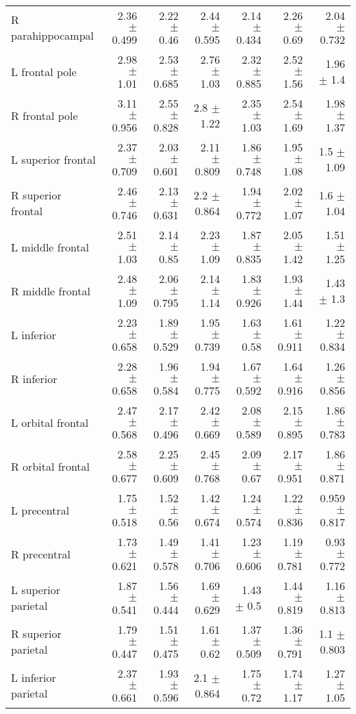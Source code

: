 \begin{table*}
\begin{tabular*}{0.975\textwidth}{@{\extracolsep{\fill}} l r r r r r r }
R parahippocampal & 2.36 $\pm$ 0.499 & 2.22 $\pm$ 0.46 & 2.44 $\pm$ 0.595 & 2.14 $\pm$ 0.434 & 2.26 $\pm$ 0.69 & 2.04 $\pm$ 0.732 \\
L frontal pole & 2.98 $\pm$ 1.01 & 2.53 $\pm$ 0.685 & 2.76 $\pm$ 1.03 & 2.32 $\pm$ 0.885 & 2.52 $\pm$ 1.56 & 1.96 $\pm$ 1.4 \\
R frontal pole & 3.11 $\pm$ 0.956 & 2.55 $\pm$ 0.828 & 2.8 $\pm$ 1.22 & 2.35 $\pm$ 1.03 & 2.54 $\pm$ 1.69 & 1.98 $\pm$ 1.37 \\
L superior frontal & 2.37 $\pm$ 0.709 & 2.03 $\pm$ 0.601 & 2.11 $\pm$ 0.809 & 1.86 $\pm$ 0.748 & 1.95 $\pm$ 1.08 & 1.5 $\pm$ 1.09 \\
R superior frontal & 2.46 $\pm$ 0.746 & 2.13 $\pm$ 0.631 & 2.2 $\pm$ 0.864 & 1.94 $\pm$ 0.772 & 2.02 $\pm$ 1.07 & 1.6 $\pm$ 1.04 \\
L middle frontal & 2.51 $\pm$ 1.03 & 2.14 $\pm$ 0.85 & 2.23 $\pm$ 1.09 & 1.87 $\pm$ 0.835 & 2.05 $\pm$ 1.42 & 1.51 $\pm$ 1.25 \\
R middle frontal & 2.48 $\pm$ 1.09 & 2.06 $\pm$ 0.795 & 2.14 $\pm$ 1.14 & 1.83 $\pm$ 0.926 & 1.93 $\pm$ 1.44 & 1.43 $\pm$ 1.3 \\
L inferior & 2.23 $\pm$ 0.658 & 1.89 $\pm$ 0.529 & 1.95 $\pm$ 0.739 & 1.63 $\pm$ 0.58 & 1.61 $\pm$ 0.911 & 1.22 $\pm$ 0.834 \\
R inferior & 2.28 $\pm$ 0.658 & 1.96 $\pm$ 0.584 & 1.94 $\pm$ 0.775 & 1.67 $\pm$ 0.592 & 1.64 $\pm$ 0.916 & 1.26 $\pm$ 0.856 \\
L orbital frontal & 2.47 $\pm$ 0.568 & 2.17 $\pm$ 0.496 & 2.42 $\pm$ 0.669 & 2.08 $\pm$ 0.589 & 2.15 $\pm$ 0.895 & 1.86 $\pm$ 0.783 \\
R orbital frontal & 2.58 $\pm$ 0.677 & 2.25 $\pm$ 0.609 & 2.45 $\pm$ 0.768 & 2.09 $\pm$ 0.67 & 2.17 $\pm$ 0.951 & 1.86 $\pm$ 0.871 \\
L precentral & 1.75 $\pm$ 0.518 & 1.52 $\pm$ 0.56 & 1.42 $\pm$ 0.674 & 1.24 $\pm$ 0.574 & 1.22 $\pm$ 0.836 & 0.959 $\pm$ 0.817 \\
R precentral & 1.73 $\pm$ 0.621 & 1.49 $\pm$ 0.578 & 1.41 $\pm$ 0.706 & 1.23 $\pm$ 0.606 & 1.19 $\pm$ 0.781 & 0.93 $\pm$ 0.772 \\
L superior parietal & 1.87 $\pm$ 0.541 & 1.56 $\pm$ 0.444 & 1.69 $\pm$ 0.629 & 1.43 $\pm$ 0.5 & 1.44 $\pm$ 0.819 & 1.16 $\pm$ 0.813 \\
R superior parietal & 1.79 $\pm$ 0.447 & 1.51 $\pm$ 0.475 & 1.61 $\pm$ 0.62 & 1.37 $\pm$ 0.509 & 1.36 $\pm$ 0.791 & 1.1 $\pm$ 0.803 \\
L inferior parietal & 2.37 $\pm$ 0.661 & 1.93 $\pm$ 0.596 & 2.1 $\pm$ 0.864 & 1.75 $\pm$ 0.72 & 1.74 $\pm$ 1.17 & 1.27 $\pm$ 1.05 \\

\end{tabular*}
\end{table*}
